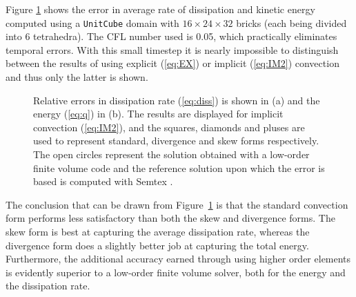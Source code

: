 Figure \ref{fig:dissipation} shows the error in average rate of dissipation and kinetic energy computed using a {\fontsize{12pt}{12pt}\texttt{UnitCube}} domain with $16\times 24\times 32$ bricks (each being divided into 6 tetrahedra). The CFL number used is 0.05, which practically eliminates temporal errors. With this small timestep it is nearly impossible to distinguish between the results of using explicit (\ref{eq:EX}) or implicit (\ref{eq:IM2}) convection and thus only the latter is shown.
\begin{figure}
  \centering
  \caption{Relative errors in dissipation rate (\ref{eq:diss}) is shown in (a) and the energy (\ref{eq:q}) in (b). The results are displayed for implicit convection (\ref{eq:IM2}), and the squares, diamonds and pluses are used to represent standard, divergence and skew forms respectively. The open circles represent the solution obtained with a low-order finite volume code and the reference solution upon which the error is based is computed with Semtex \cite{Blackburn2009}. }
  \label{fig:dissipation}
\end{figure}
The conclusion that can be drawn from Figure~\ref{fig:dissipation} is that the standard convection form performs less satisfactory than both the skew and divergence forms. The skew form is best at capturing the average dissipation rate, whereas the divergence form does a slightly better job at capturing the total energy. Furthermore, the additional accuracy earned through using higher order elements is evidently superior to a low-order finite volume solver, both for the energy and the dissipation rate.




